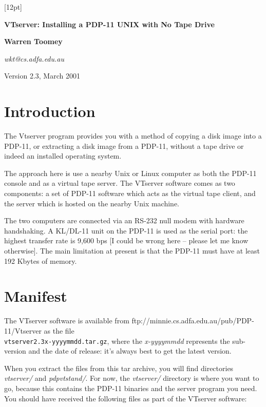 [12pt]
\setlength{\parindent}{0pt}
\setlength{\parskip}{4pt}


\begin{center}
{\LARGE \bf VTserver: Installing a PDP-11 UNIX with No Tape Drive}

{\Large \bf Warren Toomey}

{\large \it wkt@cs.adfa.edu.au}

{\large Version 2.3, March 2001}
\end{center}


\section{Introduction}

The Vtserver program provides you with a method of copying a disk image
into a PDP-11, or extracting a disk image from a PDP-11, without a tape
drive or indeed an installed operating system.

The approach here is use a nearby Unix or Linux computer as both the
PDP-11 console and as a virtual tape server.
The VTserver software comes as two components: a set of PDP-11
software which acts as the virtual tape client, and the server which is hosted
on the nearby Unix machine.

The two computers are connected via an RS-232 null modem with hardware
handshaking. A KL/DL-11 unit on the PDP-11 is used as the serial port: the
highest transfer rate is 9,600 bps [I could be wrong here -- please
let me know otherwise]. The main limitation at present is that the PDP-11
must have at least 192 Kbytes of memory.

\section{Manifest}

The VTserver software is available from
ftp://minnie.cs.adfa.edu.au/pub/PDP-11/Vtserver as the file \\
{\tt vtserver2.3x-yyyymmdd.tar.gz}, where the {\it x-yyyymmdd}
represents the sub-version and the date of release: it's always best
to get the latest version.

When you extract the files from this tar archive, you will find
directories {\it vtserver/} and {\it pdpvtstand/}.
For now, the {\it vtserver/} directory is where you want to go, because
this contains the PDP-11 binaries and the server program you need.
You should have received the following files as part of the VTserver
software:

